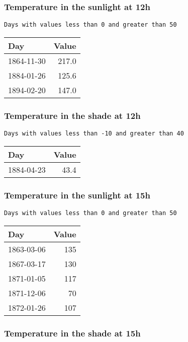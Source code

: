 \documentclass[]{article}
\begin{document}
\subsubsection{Temperature in the sunlight at
12h}\label{temperature-in-the-sunlight-at-12h-1}

\begin{verbatim}
Days with values less than 0 and greater than 50
\end{verbatim}

\begin{longtable}[]{@{}lr@{}}
\toprule
Day & Value\tabularnewline
\midrule
\endhead
1864-11-30 & 217.0\tabularnewline
1884-01-26 & 125.6\tabularnewline
1894-02-20 & 147.0\tabularnewline
\bottomrule
\end{longtable}

\subsubsection{Temperature in the shade at
12h}\label{temperature-in-the-shade-at-12h-1}

\begin{verbatim}
Days with values less than -10 and greater than 40
\end{verbatim}

\begin{longtable}[]{@{}lr@{}}
\toprule
Day & Value\tabularnewline
\midrule
\endhead
1884-04-23 & 43.4\tabularnewline
\bottomrule
\end{longtable}

\subsubsection{Temperature in the sunlight at
15h}\label{temperature-in-the-sunlight-at-15h-1}

\begin{verbatim}
Days with values less than 0 and greater than 50
\end{verbatim}

\begin{longtable}[]{@{}lr@{}}
\toprule
Day & Value\tabularnewline
\midrule
\endhead
1863-03-06 & 135\tabularnewline
1867-03-17 & 130\tabularnewline
1871-01-05 & 117\tabularnewline
1871-12-06 & 70\tabularnewline
1872-01-26 & 107\tabularnewline
\bottomrule
\end{longtable}

\subsubsection{Temperature in the shade at
15h}\label{temperature-in-the-shade-at-15h-1}
\end{document}
